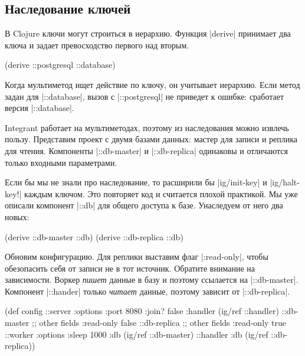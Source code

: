 \subsection{Наследование ключей}

В Clojure ключи могут строиться в иерархию. Функция \spverb|derive| принимает
два ключа и задает превосходство первого над вторым.

\begin{english}
  \begin{clojure}
(derive ::postgresql ::database)
  \end{clojure}
\end{english}

Когда мультиметод ищет действие по ключу, он учитывает иерархию. Если метод
задан для \spverb|::database|, вызов с \spverb|::postgresql| не приведет к
ошибке: сработает версия \spverb|::database|.

Integrant работает на мультиметодах, поэтому из наследования можно извлечь
пользу. Представим проект с двумя базами данных: мастер для записи и реплика для
чтения. Компоненты \spverb|::db-master| и \spverb|::db-replica| одинаковы и
отличаются только входными параметрами.

Если бы мы не знали про наследование, то расширили бы \spverb|ig/init-key| и
\spverb|ig/halt-key!| каждым ключом. Это повторяет код и считается плохой
практикой. Мы уже описали компонент \spverb|::db| для общего доступа к
базе. Унаследуем от него два новых:

\begin{english}
  \begin{clojure}
(derive ::db-master ::db)
(derive ::db-replica ::db)
  \end{clojure}
\end{english}

Обновим конфигурацию. Для реплики выставим флаг \spverb|:read-only|, чтобы
обезопасить себя от записи не в тот источник. Обратите внимание на
зависимости. Воркер \emph{пишет} данные в базу и поэтому ссылается на
\spverb|::db-master|. Компонент \spverb|::hander| только \emph{читает} данные,
поэтому зависит от \spverb|::db-replica|.

\begin{english}
  \begin{clojure}
(def config
  {::server {:options {:port 8080 :join? false}
             :handler (ig/ref ::handler)}
   ::db-master {;; other fields
                :read-only false}
   ::db-replica {;; other fields
                 :read-only true}
   ::worker {:options {:sleep 1000}
             :db (ig/ref ::db-master)}
   ::handler {:db (ig/ref ::db-replica)}})
  \end{clojure}
\end{english}

